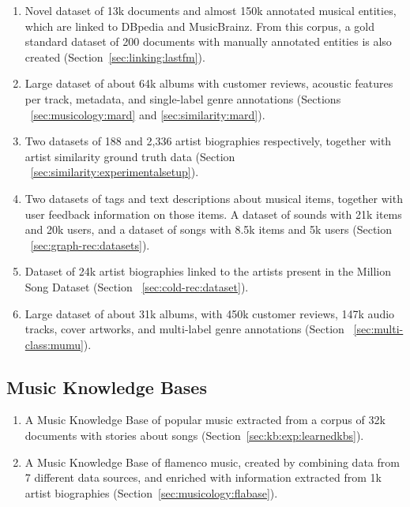 \begin{enumerate}

\item 
Novel dataset of \texttildelow13k documents and almost 150k annotated musical entities, which are linked to DBpedia and MusicBrainz. From this corpus, a gold standard dataset of 200 documents with manually annotated entities is also created (Section~\ref{sec:linking:lastfm}).

\item
Large dataset of about 64k albums with customer reviews, acoustic features per track, metadata, and single-label genre annotations (Sections ~\ref{sec:musicology:mard} and \ref{sec:similarity:mard}).

\item
Two datasets of 188 and 2,336 artist biographies respectively, together with artist similarity ground truth data (Section ~\ref{sec:similarity:experimentalsetup}).

\item
Two datasets of tags and text descriptions about musical items, together with user feedback information on those items. A dataset of sounds with \texttildelow21k items and 20k users, and a dataset of songs with \texttildelow8.5k items and \texttildelow5k users (Section ~\ref{sec:graph-rec:datasets}).

\item
Dataset of \texttildelow24k artist biographies linked to the artists present in the Million Song Dataset (Section ~\ref{sec:cold-rec:dataset}).

\item
Large dataset of about \texttildelow31k albums, with \texttildelow450k customer reviews, \texttildelow147k audio tracks, cover artworks, and multi-label genre annotations (Section ~\ref{sec:multi-class:mumu}).

\end{enumerate}

\subsection{Music Knowledge Bases}

\begin{enumerate}
\item
A Music Knowledge Base of popular music extracted from a corpus of \texttildelow32k documents with stories about songs (Section~\ref{sec:kb:exp:learnedkbs}).

\item
A Music Knowledge Base of flamenco music, created by combining data from 7 different data sources, and enriched with information extracted from \texttildelow1k artist biographies (Section~\ref{sec:musicology:flabase}).

\end{enumerate}

